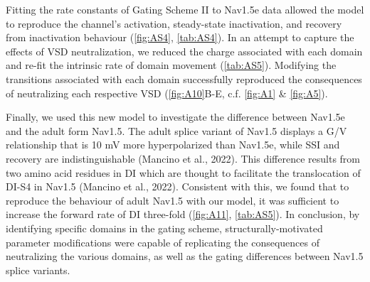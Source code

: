 Fitting the rate constants of Gating Scheme II to Nav1.5e data allowed the model to reproduce the channel’s activation, steady-state inactivation, and recovery from inactivation behaviour (\autoref{fig:AS4}, \autoref{tab:AS4}). In an attempt to capture the effects of VSD neutralization, we reduced the charge associated with each domain and re-fit the intrinsic rate of domain movement (\autoref{tab:AS5}). Modifying the transitions associated with each domain successfully reproduced the consequences of neutralizing each respective VSD (\autoref{fig:A10}B-E, c.f. \autoref{fig:A1} \& \autoref{fig:A5}).

Finally, we used this new model to investigate the difference between Nav1.5e and the adult form Nav1.5. The adult splice variant of Nav1.5 displays a G/V relationship that is 10 mV more hyperpolarized than Nav1.5e, while SSI and recovery are indistinguishable (Mancino et al., 2022). This difference results from two amino acid residues in DI which are thought to facilitate the translocation of DI-S4 in Nav1.5 (Mancino et al., 2022). Consistent with this, we found that to reproduce the behaviour of adult Nav1.5 with our model, it was sufficient to increase the forward rate of DI three-fold (\autoref{fig:A11}, \autoref{tab:AS5}). In conclusion, by identifying specific domains in the gating scheme, structurally-motivated parameter modifications were capable of replicating the consequences of neutralizing the various domains, as well as the gating differences between Nav1.5 splice variants.

